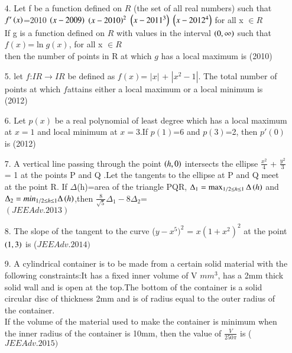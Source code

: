 \documentclass[journal,12pt,twocolumn]{IEEEtran}
\theoremstyle{remark}
\begin{document}
																				 \begin{enumerate}
																				 \item[4.] Let f be a function defined on $R$ (the set of all real numbers) such that $f'\left(x\right)$=2010 $\left(x-2009\right)$ $\left(x-2010\right)^2$ $\left(x-2011^3\right)$ $\left(x-2012^4\right)$ for all x $\in R$ \\ If g is a function defined on $R$ with values in the interval $\left(0,\infty\right)$ such that \\

																				 \hspace{1cm}  $f(x)$=$\ln{g(x)}$, for all x $\in R$\\ then the number of points in R at which $g$ has a local maximum is \hfill (2010)\\
																				 \item[5.] let $f$:$IR \rightarrow IR$ be defined as $f(x)$= $|x|$ + $|x^2-1|$. The total number of points at which $f$attains either a local maximum or a local minimum is\\ \hfill (2012) \\
																				 \item[6.]Let $p(x)$ be a real polynomial of least degree which has a local maximum at $x=1$ and local minimum at $x=3$.If $p(1)$=6 and $p(3)$=2, then $p'(0)$ is \hfill (2012) \\
																				 \item[7.]A vertical line passing through the point $\left(h,0\right)$ intersects the ellipse $\frac{x^2}{4}$ + $\frac{y^2}{3}$ = 1 at the points P and Q .Let the tangents to the ellipse at P and Q meet at the point R. If $\Delta$(h)=area of the triangle PQR, $\Delta_1  = \max _{1/2\leq h \leq 1}\Delta\left(h\right)$ and $\Delta_2 = min_{1/2\leq h \leq 1}\Delta\left(h\right)$,then $\frac{8}{\sqrt{5}}\Delta_1 - 8\Delta_2$=\\\hfill $(JEEAdv.2013)$\\
																				 \item[8.]The slope of the tangent to the curve ($y-x^5)^2$ = $x(1+x^2)^2$ at the point $\left(1,3\right)$ is \hfill ($JEE Adv. 2014)$ \\
																				 \item[9.]A cylindrical container is to be made from a certain solid material with the following constraints:It has a fixed inner volume of V $mm^3$, has a 2mm thick solid wall and is open at the top.The bottom of the container is a solid circular disc of thickness 2mm and is of radius equal to the outer radius of the container.\\If the volume of the material used to make the container is minimum when the inner radius of the container is 10mm, then the value of $\frac{V}{250\pi}$ is \hfill ($JEE Adv. 2015)$ \\  
																				 \end{enumerate}
																				 
\end{document}
